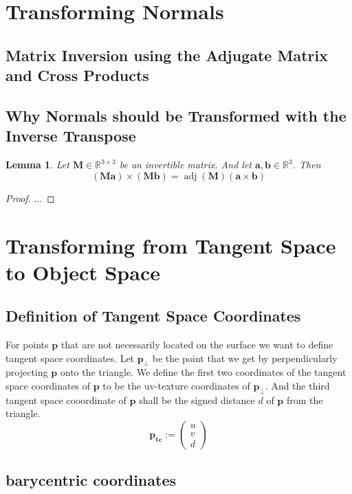 \documentclass{article}
\newtheorem{lemma}{Lemma}
\newcommand{\R}{\mathbb{R}}
\newcommand{\vctr}[1]{\mathbf{#1}}
\newcommand{\point}[1]{\mathbf{#1}}
\newcommand{\mat}[1]{\mathbf{#1}}
\newcommand{\colvec}[1]{\begin{pmatrix}#1\end{pmatrix}}
\DeclareMathOperator{\adj}{adj}
\begin{document}
\section{Transforming Normals}

\subsection{Matrix Inversion using the Adjugate Matrix and Cross Products}

\subsection{Why Normals should be Transformed with the Inverse Transpose}

\begin{lemma}
Let \(\mat{M} \in \R^{3\times 3}\) be an invertible matrix. And let \(\vctr{a}, \vctr{b} \in \R^3\). Then
\[
(\mat{M}\vctr{a})\times(\mat{M}\vctr{b}) = \adj(\mat{M}) (\vctr{a} \times \vctr{b})
\]
\end{lemma}
\begin{proof}
 ...
\end{proof}


\section{Transforming from Tangent Space to Object Space}

\subsection{Definition of Tangent Space Coordinates}
For points \(\point{p}\) that are not necessarily located on the surface we want to define tangent space coordinates. Let \(\point{p_\perp}\) be the point that we get by perpendicularly projecting \(\point{p}\) onto the triangle. We define the first two coordinates of the tangent space coordinates of \(\point{p}\) to be the uv-texture coordinates of \(\point{p_\perp}\). And the third tangent space cooordinate of \(\point{p}\) shall be the signed distance \(d\) of \(\point{p}\) from the triangle.
\begin{equation*}
 \point{p_{tc}} := \colvec{u \\ v \\ d}
\end{equation*}

\subsection{barycentric coordinates}
\end{document}
